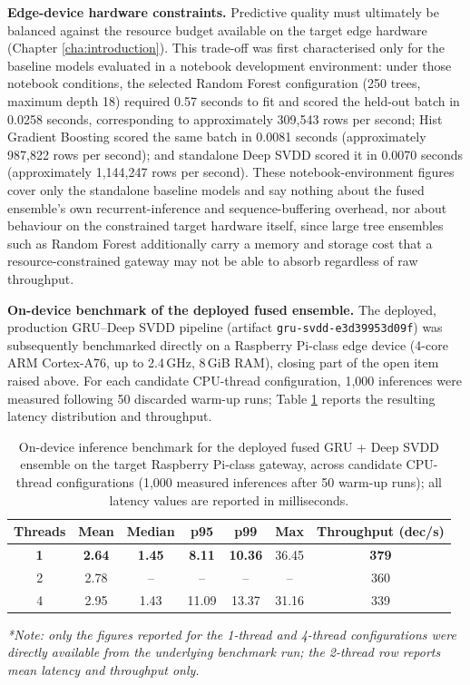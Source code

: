 \textbf{Edge-device hardware constraints.} Predictive quality must ultimately be balanced against the resource budget available on the target edge hardware (Chapter \ref{cha:introduction}). This trade-off was first characterised only for the baseline models evaluated in a notebook development environment: under those notebook conditions, the selected Random Forest configuration (250 trees, maximum depth 18) required 0.57 seconds to fit and scored the held-out batch in 0.0258 seconds, corresponding to approximately 309{,}543 rows per second; Hist Gradient Boosting scored the same batch in 0.0081 seconds (approximately 987{,}822 rows per second); and standalone Deep SVDD scored it in 0.0070 seconds (approximately 1{,}144{,}247 rows per second). These notebook-environment figures cover only the standalone baseline models and say nothing about the fused ensemble's own recurrent-inference and sequence-buffering overhead, nor about behaviour on the constrained target hardware itself, since large tree ensembles such as Random Forest additionally carry a memory and storage cost that a resource-constrained gateway may not be able to absorb regardless of raw throughput.

\textbf{On-device benchmark of the deployed fused ensemble.} The deployed, production GRU--Deep SVDD pipeline (artifact \texttt{gru-svdd-e3d39953d09f}) was subsequently benchmarked directly on a Raspberry Pi-class edge device (4-core ARM Cortex-A76, up to 2.4\,GHz, 8\,GiB RAM), closing part of the open item raised above. For each candidate CPU-thread configuration, 1{,}000 inferences were measured following 50 discarded warm-up runs; Table \ref{tb:edge_hw_benchmark} reports the resulting latency distribution and throughput.

\begin{table}[htbp]
\caption{On-device inference benchmark for the deployed fused GRU + Deep SVDD ensemble on the target Raspberry Pi-class gateway, across candidate CPU-thread configurations (1{,}000 measured inferences after 50 warm-up runs); all latency values are reported in milliseconds.}
\label{tb:edge_hw_benchmark}
\begin{center}
\begin{tabular}{|c|c|c|c|c|c|c|}
\hline
\textbf{Threads} & \textbf{Mean} & \textbf{Median} & \textbf{p95} & \textbf{p99} & \textbf{Max} & \textbf{Throughput (dec/s)} \\
\hline
\textbf{1} & \textbf{2.64} & \textbf{1.45} & \textbf{8.11} & \textbf{10.36} & 36.45 & \textbf{379} \\
\hline
2 & 2.78 & -- & -- & -- & -- & 360 \\
\hline
4 & 2.95 & 1.43 & 11.09 & 13.37 & 31.16 & 339 \\
\hline
\end{tabular}
\end{center}
\raggedright \textit{*Note: only the figures reported for the 1-thread and 4-thread configurations were directly available from the underlying benchmark run; the 2-thread row reports mean latency and throughput only.}
\end{table}

